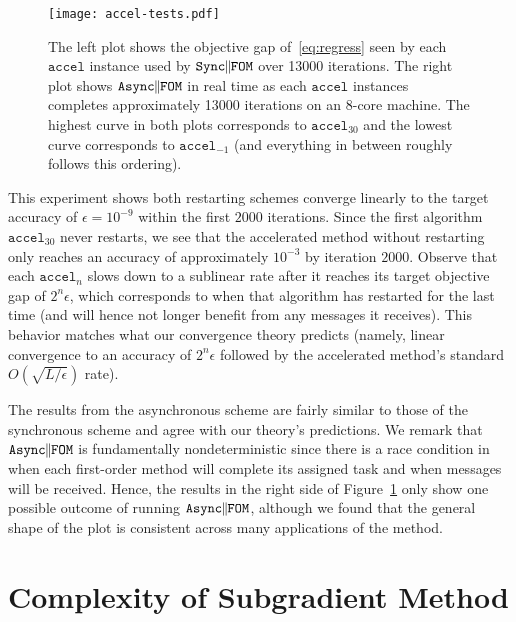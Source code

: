 \documentclass[reqno, 11pt]{amsart}
\numberwithin{equation}{section}
\newcommand{\nt}{\negthinspace}
\newcommand{\parfom}{\parallel \nt \nt  \mathtt{FOM}}
\newcommand{\sparfom}{\mathtt{Sync} \nt \nt  \parfom}
\newcommand{\aparfom}{\mathtt{Async} \nt \nt \parfom}
\begin{document}
\begin{figure}
	\centering
	\texttt{[image: accel-tests.pdf]}
	\caption{The left plot shows the objective gap of~\eqref{eq:regress} seen by each $\mathtt{accel}$ instance used by $\sparfom$ over 13000 iterations. The right plot shows $\aparfom$ in real time as each $\mathtt{accel}$ instances completes approximately 13000 iterations on an 8-core machine. The highest curve in both plots corresponds to $\mathtt{accel}_{30}$ and the lowest curve corresponds to $\mathtt{accel}_{-1}$ (and everything in between roughly follows this ordering).} \label{fig:accel}
\end{figure}

This experiment shows both restarting schemes converge linearly to the target accuracy of $\epsilon=10^{-9}$ within the first $2000$ iterations. Since the first algorithm $\mathtt{accel}_{30}$ never restarts, we see that the accelerated method without restarting only reaches an accuracy of approximately $10^{-3}$ by iteration $2000$.  
Observe that each $\mathtt{accel}_n$ slows down to a sublinear rate after it reaches its target objective gap of $2^n\epsilon$, which corresponds to when that algorithm has restarted for the last time (and will hence not longer benefit from any messages it receives). This behavior matches what our convergence theory predicts (namely, linear convergence to an accuracy of $2^n\epsilon$ followed by the accelerated method's standard $O(\sqrt{L/\epsilon})$ rate).

The results from the asynchronous scheme are fairly similar to those of the synchronous scheme and agree with our theory's predictions. 
We remark that $\aparfom$ is fundamentally nondeterministic since there is a race condition in when each first-order method will complete its assigned task and when messages will be received. Hence, the results in the right side of Figure~\ref{fig:accel} only show one possible outcome of running $\aparfom$, although we found that the general shape of the plot is consistent across many applications of the method.











  


\appendix

\section{{\bf  Complexity of Subgradient Method}}  \label{sect.j}
\end{document}
